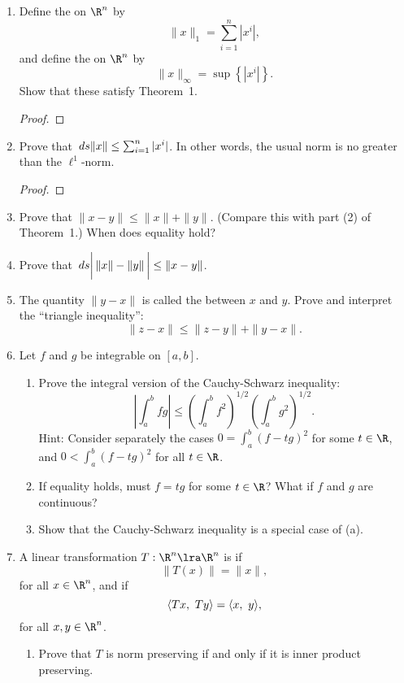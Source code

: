 \begin{enumerate}
\item\label{norms}
Define the  on $\R^n$ by
	$$\|x\|_1 = \sum_{i=1}^n |x^i|,$$
	and define the  on $\R^n$ by
	$$\|x\|_\infty = \sup\left\{|x^i|\right\}.$$
	Show that these satisfy Theorem~1.
\begin{proof}
\end{proof}

\item	Prove that $\,ds \|x\|\leq \sum_{i=1}^n |x^i|$.  In other words, the usual norm is no greater than the $\ell^1$-norm.
\begin{proof}
\end{proof}

\item	Prove that $\|x-y\| \leq \|x\| + \|y\|$.  (Compare this with part (2) of
	Theorem~1.)  When does equality hold?

\item	Prove that $\,ds \bigg| \, \|x\|-\|y\| \, \bigg| \leq \|x-y\|$.

\item	The quantity $\|y-x\|$ is called the  between $x$ and
$y$.  Prove and interpret the ``triangle inequality'':
$$\|z-x\| \leq \|z-y\| + \|y-x\|.$$

\item\label{caushw}	Let $f$ and $g$ be integrable on $[a,b]$.
\begin{enumerate}
	\item	Prove the integral version of the Cauchy-Schwarz inequality:
	$$\left|\int_a^b fg\right| \leq \left(\int_a^b
	f^2\right)^{1/2}\left(\int_a^b g^2\right)^{1/2}.$$
	Hint:  Consider separately the cases $0 = \int_a^b(f-t g)^2$ for
	some $t\in\R$, and $0<\int_a^b(f-t g)^2$ for all
	$t\in\R$.
	\item	If equality holds, must $f=t g$ for some $t\in\R$?
	What if $f$ and $g$ are continuous?
	\item	Show that the Cauchy-Schwarz inequality is a special case of
	(a).

\end{enumerate}

\item	A linear transformation $T:\R^n\lra\R^n$ is  if
$$\|T(x)\|=\|x\|,$$ for all $x\in\R^n$, and  if
$${\left\langle {Tx},~{Ty} \right\rangle} = {\left\langle {x},~{y} \right\rangle},$$ for all $x,y\in\R^n$.
\begin{enumerate}
	\item	Prove that $T$  is norm preserving if and only if it is inner
	product preserving.


\end{enumerate}
\end{enumerate}

